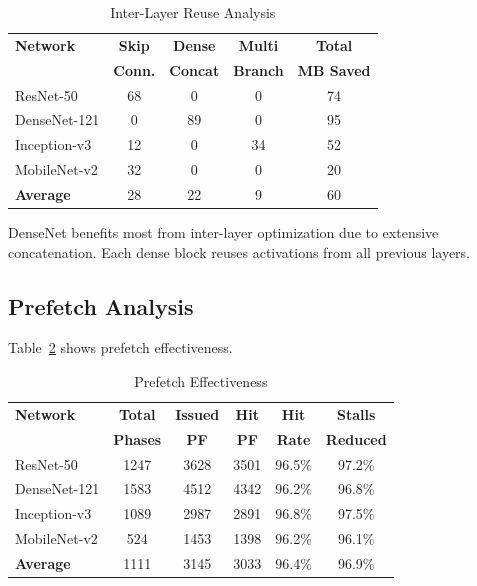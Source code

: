 \documentclass[journal]{IEEEtran}
\begin{document}
\begin{table}[t]
\centering
\caption{Inter-Layer Reuse Analysis}
\label{tab:inter_layer_detail}
\small
\begin{tabular}{lcccc}
\toprule
\textbf{Network} & \textbf{Skip} & \textbf{Dense} & \textbf{Multi} & \textbf{Total} \\
 & \textbf{Conn.} & \textbf{Concat} & \textbf{Branch} & \textbf{MB Saved} \\
\midrule
ResNet-50 & 68 & 0 & 0 & 74 \\
DenseNet-121 & 0 & 89 & 0 & 95 \\
Inception-v3 & 12 & 0 & 34 & 52 \\
MobileNet-v2 & 32 & 0 & 0 & 20 \\
\midrule
\textbf{Average} & 28 & 22 & 9 & 60 \\
\bottomrule
\end{tabular}
\end{table}

DenseNet benefits most from inter-layer optimization due to extensive concatenation. Each dense block reuses activations from all previous layers.

\subsection{Prefetch Analysis}

Table~\ref{tab:prefetch_detail} shows prefetch effectiveness.

\begin{table}[t]
\centering
\caption{Prefetch Effectiveness}
\label{tab:prefetch_detail}
\small
\begin{tabular}{lccccc}
\toprule
\textbf{Network} & \textbf{Total} & \textbf{Issued} & \textbf{Hit} & \textbf{Hit} & \textbf{Stalls} \\
 & \textbf{Phases} & \textbf{PF} & \textbf{PF} & \textbf{Rate} & \textbf{Reduced} \\
\midrule
ResNet-50 & 1247 & 3628 & 3501 & 96.5\% & 97.2\% \\
DenseNet-121 & 1583 & 4512 & 4342 & 96.2\% & 96.8\% \\
Inception-v3 & 1089 & 2987 & 2891 & 96.8\% & 97.5\% \\
MobileNet-v2 & 524 & 1453 & 1398 & 96.2\% & 96.1\% \\
\midrule
\textbf{Average} & 1111 & 3145 & 3033 & 96.4\% & 96.9\% \\
\bottomrule
\end{tabular}
\end{table}
\end{document}
